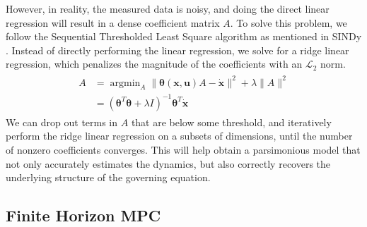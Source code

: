 \documentclass[10pt,twocolumn]{article}
\DeclareMathOperator*{\argmin}{argmin}
\begin{document}
However, in reality, the measured data is noisy, and doing the direct linear regression
will result in a dense coefficient matrix $A$. To solve this problem, we follow
the Sequential Thresholded Least Square algorithm as mentioned in SINDy \cite{sindy}.
Instead of directly performing the linear regression, we solve for a ridge linear regression,
which penalizes the magnitude of the coefficients with an $\mathcal{L}_2$ norm.
\begin{gather}\label{eqa:ridge_regression}
  \begin{aligned}
    A &= \argmin_A \| \bm{\theta}(\bm{x}, \bm{u})A - \dot{\bm{x}} \|^2 + \lambda \| A \|^2 \\
      &= (\bm{\theta}^T \bm{\theta} + \lambda I)^{-1}\bm{\theta}^T \dot{\bm{x}}
  \end{aligned}
\end{gather}
We can drop out terms in $A$ that are below some threshold, and iteratively perform the
ridge linear regression on a subsets of dimensions, until the number of nonzero coefficients
converges. This will help obtain a parsimonious model that not only accurately estimates the
dynamics, but also correctly recovers the underlying structure of the governing equation.

\subsection{Finite Horizon MPC}\label{sec:mpc}
\end{document}

